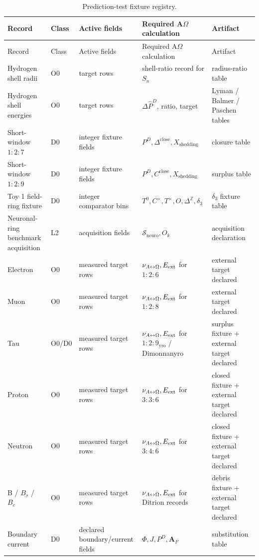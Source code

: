 \scriptsize
\begin{longtable}{@{}p{}p{}p{}p{}p{}@{}}
\caption{Prediction-test fixture registry.}\label{tab:manual-prediction-test-registry}\\
\toprule
Record & Class & Active fields & Required A\(\Omega\) calculation & Artifact\\
\midrule
\endfirsthead
\toprule
Record & Class & Active fields & Required A\(\Omega\) calculation & Artifact\\
\midrule
\endhead
Hydrogen shell radii & O0 & target rows & shell-ratio record for $S_n$ & radius-ratio table\\
Hydrogen shell energies & O0 & target rows & $\Delta\widehat P^D$, ratio, target & Lyman / Balmer / Paschen tables\\
Short-window $1{:}2{:}7$ & D0 & integer fixture fields & $P^D,\Delta^{\mathrm{close}},X_{\mathrm{shedding}}$ & closure table\\
Short-window $1{:}2{:}9$ & D0 & integer fixture fields & $P^D,C^{\mathrm{close}},X_{\mathrm{shedding}}$ & surplus table\\
Toy 1 field-ring fixture & D0 & integer comparator bins & $T^0,C^\times,T^\times,O,\Delta^{\mathbb Z},\delta_3$ & \(\delta_3\) fixture table\\
Neuronal-ring benchmark acquisition & L2 & acquisition fields & $\mathcal S_{\mathrm{neuro}},O_k$ & acquisition declaration\\
Electron & O0 & measured target rows & $\nu_{A{\leftrightarrow}\Omega},E_{\mathrm{ext}}$ for $1{:}2{:}6$ & external target declared\\
Muon & O0 & measured target rows & $\nu_{A{\leftrightarrow}\Omega},E_{\mathrm{ext}}$ for $1{:}2{:}8$ & external target declared\\
Tau & O0/D0 & measured target rows & $\nu_{A{\leftrightarrow}\Omega},E_{\mathrm{ext}}$ for $1{:}2{:}9_{\mathrm{yro}}$ / Dimonnanyro & surplus fixture + external target declared\\
Proton & O0 & measured target rows & $\nu_{A{\leftrightarrow}\Omega},E_{\mathrm{ext}}$ for $3{:}3{:}6$ & closed fixture + external target declared\\
Neutron & O0 & measured target rows & $\nu_{A{\leftrightarrow}\Omega},E_{\mathrm{ext}}$ for $3{:}4{:}6$ & closed fixture + external target declared\\
B / $B_s$ / $B_c$ & O0 & measured target rows & $\nu_{A{\leftrightarrow}\Omega},E_{\mathrm{ext}}$ for Ditrion records & debris fixture + external target declared\\
Boundary current & D0 & declared boundary/current fields & $\Phi,J,P^D,\mathbf A_F$ & substitution table\\

\end{longtable}
